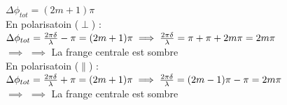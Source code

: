 \documentclass[12pt]{book}
\begin{document}
\begin{itemize}
\begin{itemize}
                            $\Delta\phi_{tot}= (2m+1)\pi$\\
                            En polarisatoin ($ \perp $) :   $\Delta\phi_{tot}=\frac{2\pi\delta}{\lambda}-\pi=(2m+1)\pi  \\ \implies\frac{2\pi\delta}{\lambda}=\pi + \pi + 2m\pi = 2m\pi$\\
                            $\implies$ $\implies$ La frange centrale est sombre\\
                            En polarisatoin ($ \parallel $) :   $\Delta\phi_{tot}=\frac{2\pi\delta}{\lambda}+\pi=(2m+1)\pi \\ \implies\frac{2\pi\delta}{\lambda}=(2m-1)\pi-\pi=2m\pi$ \\ 
                            $\implies$ $\implies$ La frange centrale est sombre\\
                    \end{itemize}
            \end{itemize}
\end{document}
